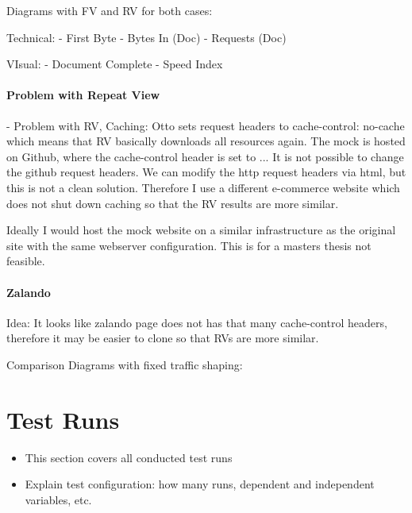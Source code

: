 Diagrams with FV and RV for both cases:

Technical:
- First Byte
- Bytes In (Doc)
- Requests (Doc)

VIsual:
- Document Complete
- Speed Index

\paragraph{Problem with Repeat View}

- Problem with RV, Caching:
Otto sets request headers to cache-control: no-cache which means that RV basically downloads all resources again.
The mock is hosted on Github, where the cache-control header is set to ...
It is not possible to change the github request headers. We can modify the http request headers via html, but this is not a clean solution.
Therefore I use a different e-commerce website which does not shut down caching so that the RV results are more similar.

Ideally I would host the mock website on a similar infrastructure as the original site with the same webserver configuration. This is for a masters thesis not feasible.





\paragraph{Zalando}

Idea: It looks like zalando page does not has that many cache-control headers, therefore it may be easier to clone so that RVs are more similar.

Comparison Diagrams with fixed traffic shaping:








\section{Test Runs}

\begin{itemize}
    \item This section covers all conducted test runs
    \item Explain test configuration: how many runs, dependent and independent variables, etc.
\end{itemize}




